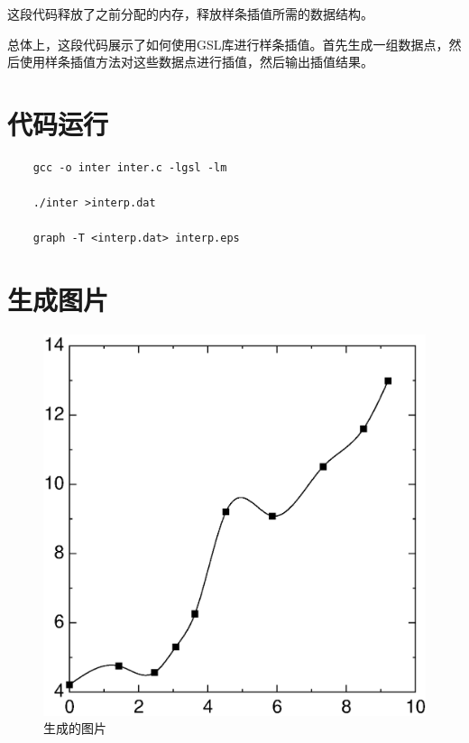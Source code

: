 \documentclass{ctexart}
\begin{document}
这段代码释放了之前分配的内存，释放样条插值所需的数据结构。

总体上，这段代码展示了如何使用GSL库进行样条插值。首先生成一组数据点，然后使用样条插值方法对这些数据点进行插值，然后输出插值结果。
\section{代码运行}
\begin{lstlisting}
    gcc -o inter inter.c -lgsl -lm

    ./inter >interp.dat

    graph -T <interp.dat> interp.eps
\end{lstlisting}

\section{生成图片}
\begin{figure}[H]
    \centering
    \includegraphics{interp.eps}
    \caption{生成的图片}
    \label{fig:picture}
\end{figure}
\end{document}
